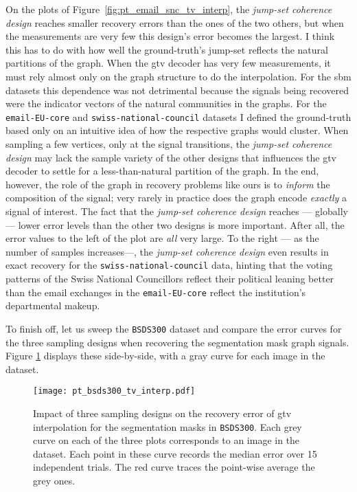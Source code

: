 On the plots of Figure~\ref{fig:pt_email_snc_tv_interp}, the \emph{jump-set coherence design} reaches smaller recovery errors than the ones of the two others, but when the measurements are very few this design's error becomes the largest. I think this has to do with how well the ground-truth's jump-set reflects the natural partitions of the graph. When the \acrshort{gtv} decoder has very few measurements, it must rely almost only on the graph structure to do the interpolation. For the \acrshort{sbm} datasets this dependence was not detrimental because the signals being recovered were the indicator vectors of the natural communities in the graphs. For the \texttt{email-EU-core} and \texttt{swiss-national-council} datasets I defined the ground-truth based only on an intuitive idea of how the respective graphs would cluster. When sampling a few vertices, only at the signal transitions, the \emph{jump-set coherence design} may lack the sample variety of the other designs that influences the \acrshort{gtv} decoder to settle for a less-than-natural partition of the graph. In the end, however, the role of the graph in recovery problems like ours is to \emph{inform} the composition of the signal; very rarely in practice does the graph encode \emph{exactly} a signal of interest. The fact that the \emph{jump-set coherence design} reaches --- globally --- lower error levels than the other two designs is more important. After all, the error values to the left of the plot are \emph{all} very large. To the right --- as the number of samples increases---, the \emph{jump-set coherence design} even results in exact recovery for the \texttt{swiss-national-council} data, hinting that the voting patterns of the Swiss National Councillors reflect their political leaning better than the email exchanges in the \texttt{email-EU-core} reflect the institution's departmental makeup.

To finish off, let us sweep the \texttt{BSDS300} dataset and compare the error curves for the three sampling designs when recovering the segmentation mask graph signals. Figure \ref{fig:pt_bsds300_tv_interp} displays these side-by-side, with a gray curve for each image in the dataset.

\begin{figure}[H]
    \centering
    \texttt{[image: pt\_bsds300\_tv\_interp.pdf]}
    \caption[Three sampling designs: \texttt{BSDS300}]{Impact of three sampling designs on the recovery error of \acrshort{gtv} interpolation for the segmentation masks in \texttt{BSDS300}. Each grey curve on each of the three plots corresponds to an image in the dataset. Each point in these curve records the median error over 15 independent trials. The red curve traces the point-wise average the grey ones.}
    \label{fig:pt_bsds300_tv_interp}
\end{figure}

